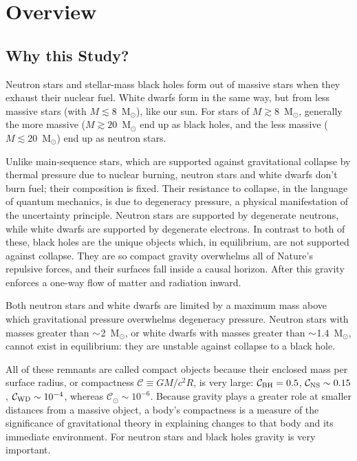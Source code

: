 \chapter{Overview}
\label{chap:overview}

\section{Why this Study?}

Neutron stars and stellar-mass black holes form out of massive stars when they
exhaust their nuclear fuel. White dwarfs form in the same way, but from less
massive stars (with $M\lesssim 8$~M$_{\odot}$), like our sun.
For stars of $M\gtrsim 8$~M$_{\odot}$, generally the more massive
($M\gtrsim 20$~M$_{\odot}$ end up as black holes, and the less massive
($M\lesssim 20$~M$_{\odot}$) end up as neutron stars.
\citep{woos2002-review_stellar_evolution}

Unlike main-sequence stars, which are supported against gravitational collapse
by thermal pressure due to nuclear burning, neutron stars and white dwarfs
don't burn fuel; their composition is fixed.
Their resistance to collapse, in the language of quantum mechanics, is due
to degeneracy pressure, a physical manifestation of the uncertainty principle.
Neutron stars are supported by degenerate neutrons, while white dwarfs are
supported by degenerate electrons. In contrast to both of these, black holes
are the unique objects which, in equilibrium, are not supported against
collapse. They are so compact gravity overwhelms all of Nature's repulsive
forces, and their surfaces fall inside a causal horizon. After this gravity
enforces a one-way flow of matter and radiation inward.

Both neutron stars and white dwarfs are limited by a maximum mass above which
gravitational pressure overwhelms degeneracy pressure. Neutron stars with masses
greater than $\mathord{\sim}$2~M$_\odot$, or white dwarfs with masses greater than
$\mathord{\sim}$1.4~M$_\odot$, cannot exist in equilibrium: they are unstable against
collapse to a black hole.

All of these remnants are called compact objects because their enclosed mass per
surface radius, or compactness $\mathcal{C}\equiv G M/c^2 R$, is very large:
$\mathcal{C}_{\rm BH}=0.5$,
$\mathcal{C}_{\rm NS}\sim0.15$,
$\mathcal{C}_{\rm WD}\sim10^{-4}$,
whereas $\mathcal{C}_{\odot}\sim10^{-6}$.
Because gravity plays a greater role at smaller distances from a massive object,
a body's compactness is a measure of the significance of gravitational theory
in explaining changes to that body and its immediate environment.
For neutron stars and black holes gravity is very important.

